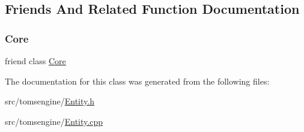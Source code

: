 \subsection{Friends And Related Function Documentation}
\mbox{\label{classtomsengine_1_1_entity_a4107254ac74f90d4f91e810d755b98c2}} 
\subsubsection{\texorpdfstring{Core}{Core}}
{\footnotesize\ttfamily friend class \mbox{\hyperlink{classtomsengine_1_1_core}{Core}}\hspace{0.3cm}{\ttfamily [friend]}}



The documentation for this class was generated from the following files\+:\begin{DoxyCompactItemize}
\item 
src/tomsengine/\mbox{\hyperlink{_entity_8h}{Entity.\+h}}\item 
src/tomsengine/\mbox{\hyperlink{_entity_8cpp}{Entity.\+cpp}}\end{DoxyCompactItemize}
